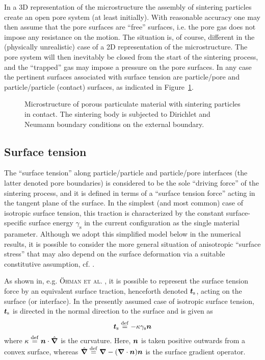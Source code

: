 \documentclass[10pt,a4paper]{article}
\newcommand{\figref}[1]{Figure~\ref{#1}}
\newcommand{\surf}{\mathrm{s}}
\begin{document}
In a 3D representation of the microstructure the assembly of sintering particles create an open pore system (at least initially). With reasonable accuracy one may then assume that the pore surfaces are ``free'' surfaces, i.e. the pore gas does not impose any resistance on the motion. The situation is, of course, different in the (physically unrealistic) case of a 2D representation of the microstructure. The pore system will then inevitably be closed from the start of the sintering process, and the ``trapped'' gas may impose a pressure on the pore surfaces. In any case the pertinent surfaces associated with surface tension are particle/pore and particle/particle (contact) surfaces, as indicated in \figref{fig:micro}.
\begin{figure}[th!]
    \centering
    
    \caption{Microstructure of porous particulate material with sintering particles in contact. The sintering body is subjected to Dirichlet and Neumann boundary conditions on the external boundary.}
    \label{fig:micro}
\end{figure}


\subsection{Surface tension}

The ``surface tension'' along particle/particle and particle/pore interfaces (the latter denoted pore boundaries) is considered to be the sole ``driving force'' of the sintering process, and it is defined in terms of a ``surface tension force'' acting in the tangent plane of the surface. In the simplest (and most common) case of isotropic surface tension, this traction is characterized by the constant surface-specific surface energy $\gamma_\surf$ in the current configuration as the single material parameter. Although we adopt this simplified model below in the numerical results, it is possible to consider the more general situation of anisotropic ``surface stress'' that may also depend on the surface deformation via a suitable constitutive assumption, cf. \cite{Steinmann2008:boundaryenergies}.

As shown in, e.g. \textsc{Öhman et al.} \cite{OhmanRunLar2011}, it is possible to represent the surface tension force by an equivalent surface traction, henceforth denoted $\boldsymbol{t}_{\mathrm{s}}$, acting on the surface (or interface). In the presently assumed case of isotropic surface tension, $\boldsymbol{t}_{\mathrm{s}}$ is directed in the normal direction to the surface and is given as
\begin{equation}
    \ta{t}_\surf\defeq -\kappa\gamma_\surf\ta{n}
\label{eq103aKR}
\end{equation}
where $\kappa\overset{\mathrm{def}}{=}\boldsymbol{n}\cdot\hat{\boldsymbol{\nabla}}$ is the curvature. Here, $\boldsymbol{n}$ is taken positive outwards from a convex surface, whereas $\hat{\boldsymbol{\nabla}} \overset{\mathrm{def}}{=} \boldsymbol{\nabla} - (\boldsymbol{\nabla}\cdot\boldsymbol{n})\boldsymbol{n}$ is the surface gradient operator.
\end{document}
